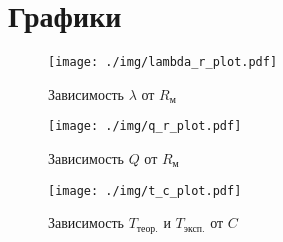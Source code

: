 \clearpage
\section{Графики}
\begin{figure}[H]
  \centering
\texttt{[image: ./img/lambda\_r\_plot.pdf]}
\caption{Зависимость \(\lambda\) от \(R_\text{м}\)}
\label{fig:lambda_r}
\end{figure}


\begin{figure}[H]
  \centering
\texttt{[image: ./img/q\_r\_plot.pdf]}
\caption{Зависимость \(Q\) от \(R_\text{м}\)}
\label{fig:q_r}
\end{figure}

\begin{figure}[H]
  \centering
\texttt{[image: ./img/t\_c\_plot.pdf]}
  \caption{Зависимость \(T_\text{теор.}\) и \(T_\text{эксп.}\) от \(C\)}
\label{fig:t_c}
\end{figure}

